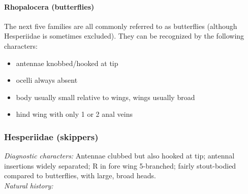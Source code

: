 \documentclass[letterpaper, 11pt]{article}
\begin{document}
\paragraph{Rhopalocera (butterflies)} The next five families are all commonly referred to as butterflies (although Hesperiidae is sometimes excluded). They can be recognized by the following characters:
\begin{itemize}
\item antennae knobbed/hooked at tip
\item ocelli always absent
\item body usually small relative to wings, wings usually broad
\item hind wing with only 1 or 2 anal veins
\end{itemize}

\subsubsection{Hesperiidae (skippers)}
\noindent{}\textit{Diagnostic characters:} Antennae clubbed but also hooked at tip; antennal insertions widely separated; R in fore wing 5-branched; fairly stout-bodied compared to butterflies, with large, broad heads.\\

\noindent{}\textit{Natural history:} 
\end{document}
